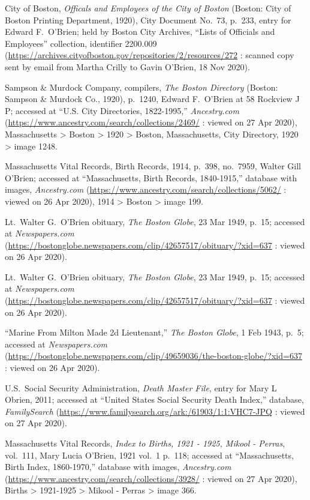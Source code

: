 \begin{thebibliography}{999}
City of Boston, \textit{Officals and Employees of the City of Boston} (Boston: City of Boston Printing Department, 1920), City Document No.\ 73, p.\ 233, 
entry for Edward F.\ O'Brien; held by Boston City Archives, ``Lists of Officials and Employees'' collection, identifier 2200.009 (\url{https://archives.cityofboston.gov/repositories/2/resources/272} : scanned copy sent by email from Martha Crilly to Gavin O'Brien, 18 Nov 2020).

Sampson \& Murdock Company, compilers, \textit{The Boston Directory} (Boston: Sampson \& Murdock Co., 1920), p.\ 1240, Edward F.\ O'Brien at 58 Rockview J P; accessed at ``U.S. City Directories, 1822-1995,'' \textit{Ancestry.com} (\url{https://www.ancestry.com/search/collections/2469/} : viewed on 27 Apr 2020), Massachusetts > Boston > 1920 > Boston, Massachusetts, City Directory, 1920 > image 1248.

Massachusetts Vital Records, Birth Records, 1914, p.\ 398, no.\ 7959, Walter Gill O'Brien; accessed at ``Massachusetts, Birth Records, 1840-1915,'' database with images, \textit{Ancestry.com} (\url{https://www.ancestry.com/search/collections/5062/} : viewed on 26 Apr 2020), 1914 > Boston > image 199.

Lt.\ Walter G.\ O'Brien obituary, \textit{The Boston Globe}, 23 Mar 1949, p.\ 15; accessed at \textit{Newspapers.com} (\url{https://bostonglobe.newspapers.com/clip/42657517/obituary/?xid=637} : viewed on 26 Apr 2020).

Lt.\ Walter G.\ O'Brien obituary, \textit{The Boston Globe}, 23 Mar 1949, p.\ 15; accessed at \textit{Newspapers.com} (\url{https://bostonglobe.newspapers.com/clip/42657517/obituary/?xid=637} : viewed on 26 Apr 2020).

``Marine From Milton Made 2d Lieutenant,'' \textit{The Boston Globe}, 1 Feb 1943, p.\ 5; accessed at \textit{Newspapers.com} (\url{https://bostonglobe.newspapers.com/clip/49659036/the-boston-globe/?xid=637} : viewed on 26 Apr 2020).

U.S.\ Social Security Administration, \textit{Death Master File}, entry for Mary L Obrien, 2011; accessed at ``United States Social Security Death Index,'' database, \textit{FamilySearch} (\url{https://www.familysearch.org/ark:/61903/1:1:VHC7-JPQ} : viewed on 27 Apr 2020).

Massachusetts Vital Records, \textit{Index to Births, 1921 - 1925, Mikool - Perras}, vol.\ 111, Mary Lucia O'Brien, 1921 vol.\ 1 p.\ 118; accessed at ``Massachusetts, Birth Index, 1860-1970,'' database with images, \textit{Ancestry.com} (\url{https://www.ancestry.com/search/collections/3928/} : viewed on 27 Apr 2020), Births > 1921-1925 > Mikool - Perras > image 366.


\end{thebibliography}
